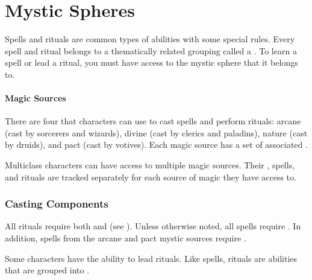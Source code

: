 \chapter{Mystic Spheres}\label{Mystic Spheres}

  Spells and rituals are common types of \magical abilities with some special rules.
  Every spell and ritual belongs to a thematically related grouping called a .
  To learn a spell or lead a ritual, you must have access to the mystic sphere that it belongs to.

  \subsubsection{Magic Sources}
    There are four  that characters can use to cast spells and perform rituals: arcane (cast by sorcerers and wizards), divine (cast by clerics and paladins), nature (cast by druids), and pact (cast by votives).
    Each magic source has a set of associated .

    Multiclass characters can have access to multiple magic sources.
    Their , spells, and rituals are tracked separately for each source of magic they have access to.

  \subsection{Casting Components}\label{Casting Components}
    All rituals require both  and  (see ).
    Unless otherwise noted, all spells require .
    In addition, spells from the arcane and pact mystic sources require .

    Some characters have the ability to lead rituals.
    Like spells, rituals are \magical abilities that are grouped into .

